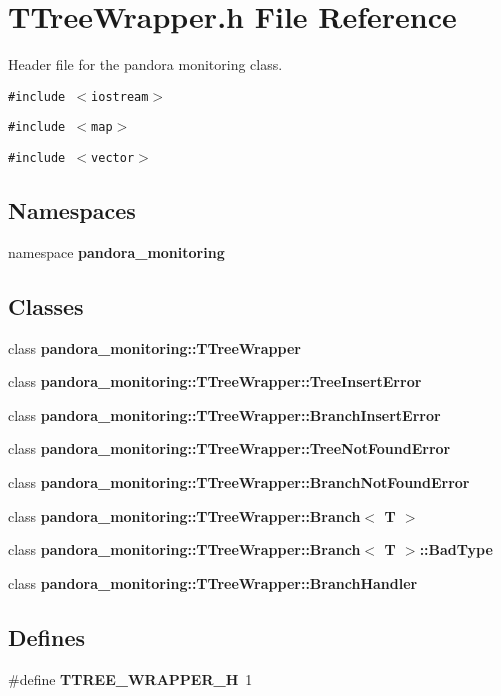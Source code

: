 \section{TTree\-Wrapper.h File Reference}
\label{TTreeWrapper_8h}
Header file for the pandora monitoring class. 

{\tt \#include $<$iostream$>$}\par
{\tt \#include $<$map$>$}\par
{\tt \#include $<$vector$>$}\par
\subsection*{Namespaces}
\begin{CompactItemize}
\item 
namespace \textbf{pandora\_\-monitoring}
\end{CompactItemize}
\subsection*{Classes}
\begin{CompactItemize}
\item 
class \textbf{pandora\_\-monitoring::TTree\-Wrapper}
\item 
class \textbf{pandora\_\-monitoring::TTree\-Wrapper::Tree\-Insert\-Error}
\item 
class \textbf{pandora\_\-monitoring::TTree\-Wrapper::Branch\-Insert\-Error}
\item 
class \textbf{pandora\_\-monitoring::TTree\-Wrapper::Tree\-Not\-Found\-Error}
\item 
class \textbf{pandora\_\-monitoring::TTree\-Wrapper::Branch\-Not\-Found\-Error}
\item 
class \textbf{pandora\_\-monitoring::TTree\-Wrapper::Branch$<$ T $>$}
\item 
class \textbf{pandora\_\-monitoring::TTree\-Wrapper::Branch$<$ T $>$::Bad\-Type}
\item 
class \textbf{pandora\_\-monitoring::TTree\-Wrapper::Branch\-Handler}
\end{CompactItemize}
\subsection*{Defines}
\begin{CompactItemize}
\item 
\#define \textbf{TTREE\_\-WRAPPER\_\-H}~1\label{TTreeWrapper_8h_464d8ca0f64af3a4c1d8ebfdbd6e6399}

\end{CompactItemize}
